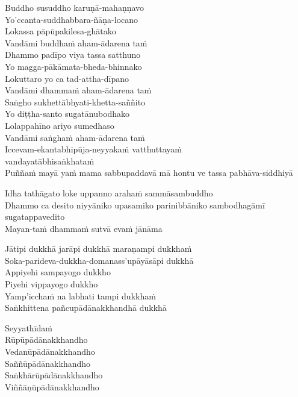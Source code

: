 \begin{leader}
\end{leader}


Buddho susuddho karuṇā-mahaṇṇavo\\
Yo'ccanta-suddhabbara-ñāṇa-locano\\
Lokassa pāpūpakilesa-ghātako\\
Vandāmi buddhaṁ aham-ādarena taṁ\\
Dhammo padīpo viya tassa satthuno\\
Yo magga-pākāmata-bheda-bhinnako\\
Lokuttaro yo ca tad-attha-dīpano\\
Vandāmi dhammaṁ aham-ādarena taṁ\\
Saṅgho sukhettābhyati-khetta-saññito\\
Yo diṭṭha-santo sugatānubodhako\\
Lolappahīno ariyo sumedhaso\\
Vandāmi saṅghaṁ aham-ādarena taṁ\\
Iccevam-ekantabhipūja-neyyakaṁ vatthuttayaṁ \\vandayatābhisaṅkhataṁ\\
Puññaṁ mayā yaṁ mama sabbupaddavā mā hontu ve tassa pabhāva-siddhiyā

Idha tathāgato loke uppanno arahaṁ sammāsambuddho\\
Dhammo ca desito niyyāniko upasamiko parinibbāniko sambodhagāmī sugatappavedito\\
Mayan-taṁ dhammaṁ sutvā evaṁ jānāma

Jātipi dukkhā jarāpi dukkhā maraṇampi dukkhaṁ\\
Soka-parideva-dukkha-domanass'upāyāsāpi dukkhā\\
Appiyehi sampayogo dukkho\\
Piyehi vippayogo dukkho\\
Yamp'icchaṁ na labhati tampi dukkhaṁ\\
Saṅkhittena pañcupādānakkhandhā dukkhā

Seyyathīdaṁ\\
Rūpūpādānakkhandho\\
Vedanūpādānakkhandho\\
Saññūpādānakkhandho\\
Saṅkhārūpādānakkhandho\\
Viññāṇūpādānakkhandho

